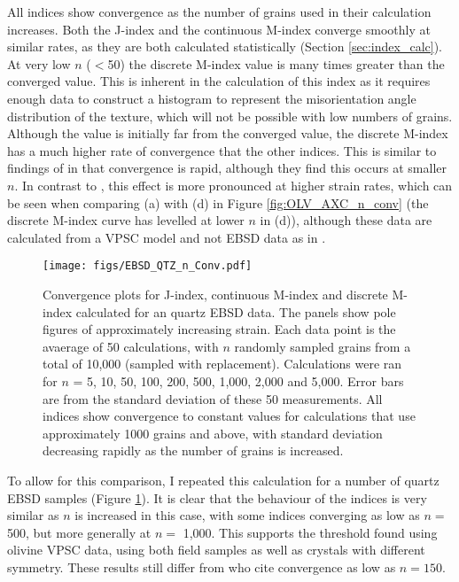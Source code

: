 \documentclass[a4paper,12pt,twoside]{report}
\numberwithin{equation}{chapter}
\begin{document}
All indices show convergence as the number of grains used in their calculation increases. Both the J-index and the continuous M-index converge smoothly at similar rates, as they are both calculated statistically (Section \ref{sec:index_calc}). At very low $n$ ($<$50) the discrete M-index value is many times greater than the converged value. This is inherent in the calculation of this index as it requires enough data to construct a histogram to represent the misorientation angle distribution of the texture, which will not be possible with low numbers of grains. Although the value is initially far from the converged value, the discrete M-index has a much higher rate of convergence that the other indices. This is similar to findings of \cite{Skemer} in that convergence is rapid, although they find this occurs at smaller $n$. In contrast to \cite{Skemer}, this effect is more pronounced at higher strain rates, which can be seen when comparing (a) with (d) in Figure \ref{fig:OLV_AXC_n_conv} (the discrete M-index curve has levelled at lower $n$ in (d)), although these data are calculated from a VPSC model and not EBSD data as in \cite{Skemer}.

\begin{figure}[t!]
  \centering
    \texttt{[image: figs/EBSD\_QTZ\_n\_Conv.pdf]}
  \caption[Convergence with no. of grains (quartz EBSD)]{Convergence plots for J-index, continuous M-index and discrete M-index calculated for an quartz EBSD data. The panels show pole figures of approximately increasing strain. Each data point is the avaerage of 50 calculations, with $n$ randomly sampled grains from a total of 10,000 (sampled with replacement). Calculations were ran for $n$ = 5, 10, 50, 100, 200, 500, 1,000, 2,000 and 5,000. Error bars are from the standard deviation of these 50 measurements. All indices show convergence to constant values for calculations that use approximately 1000 grains and above, with standard deviation decreasing rapidly as the number of grains is increased.}
  \label{fig:EBSD_QTZ_n_conv}
\end{figure}

To allow for this comparison, I repeated this calculation for a number of quartz EBSD samples (Figure \ref{fig:EBSD_QTZ_n_conv}). It is clear that the behaviour of the indices is very similar as $n$ is increased in this case, with some indices converging as low as $n =$ 500, but more generally at $n =$ 1,000. This supports the threshold found using olivine VPSC data, using both field samples as well as crystals with different symmetry. These results still differ from \cite{Skemer} who cite convergence as low as $n = 150$. 
\end{document}
